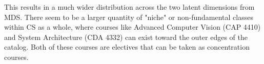 This results in a much wider distribution across the two latent dimensions from MDS. There seem to be a larger quantity of 
"niche" or non-fundamental classes within CS as a whole, where courses like Advanced Computer Vision (CAP 4410) and 
System Architecture (CDA 4332) can exist toward the outer edges of the catalog. Both of these courses are electives that can be taken 
as concentration courses. 
